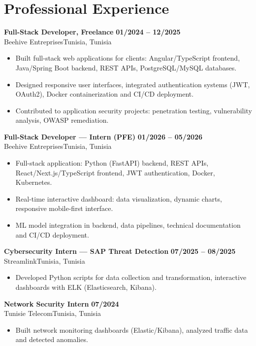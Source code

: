 \documentclass[a4paper,10pt]{article}
\newcommand{\cventry}[4]{\textbf{#1} \hfill \textbf{#4}\\[1pt]#2{\ifx\relax#3\relax\else, #3\fi}\par\vspace{1pt}}
\begin{document}
\section{Professional Experience}
\cventry{Full-Stack Developer, Freelance}{Beehive Entreprises}{Tunisia}{01/2024 -- 12/2025}
\begin{itemize}
  \item Built full-stack web applications for clients: Angular/TypeScript frontend, Java/Spring Boot backend, REST APIs, PostgreSQL/MySQL databases.
  \item Designed responsive user interfaces, integrated authentication systems (JWT, OAuth2), Docker containerization and CI/CD deployment.
  \item Contributed to application security projects: penetration testing, vulnerability analysis, OWASP remediation.
\end{itemize}
\cventry{Full-Stack Developer --- Intern (PFE)}{Beehive Entreprises}{Tunisia}{01/2026 -- 05/2026}
\begin{itemize}
  \item Full-stack application: Python (FastAPI) backend, REST APIs, React/Next.js/TypeScript frontend, JWT authentication, Docker, Kubernetes.
  \item Real-time interactive dashboard: data visualization, dynamic charts, responsive mobile-first interface.
  \item ML model integration in backend, data pipelines, technical documentation and CI/CD deployment.
\end{itemize}
\cventry{Cybersecurity Intern --- SAP Threat Detection}{Streamlink}{Tunisia}{07/2025 -- 08/2025}
\begin{itemize}
  \item Developed Python scripts for data collection and transformation, interactive dashboards with ELK (Elasticsearch, Kibana).
\end{itemize}
\cventry{Network Security Intern}{Tunisie Telecom}{Tunisia}{07/2024}
\begin{itemize}
  \item Built network monitoring dashboards (Elastic/Kibana), analyzed traffic data and detected anomalies.
\end{itemize}
\end{document}
